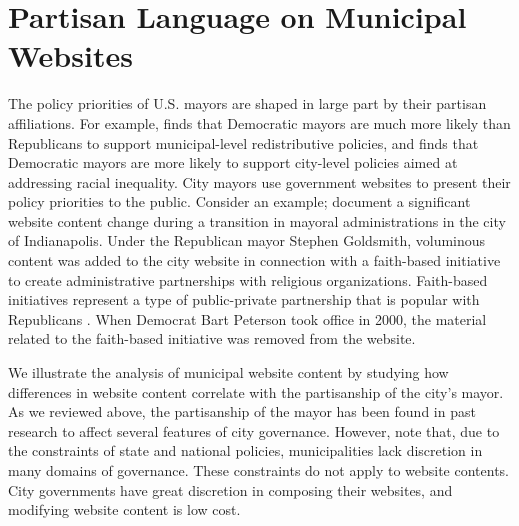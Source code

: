 \documentclass[11pt]{article}
\begin{document}
\section{Partisan Language on Municipal Websites}

The policy priorities of U.S. mayors are shaped in large part by their partisan affiliations. For example, \citet{einstein2018mayors} finds that Democratic mayors are much more likely than Republicans to support municipal-level redistributive policies, and \citet{einstein2021pictures} finds that Democratic mayors are more likely to support city-level policies aimed at addressing racial inequality. City mayors use government websites to present their policy priorities to the public. Consider an example; \citet[p.55]{formicola2003faith} document a significant website content change during a transition in mayoral administrations in the city of Indianapolis. Under the Republican mayor Stephen Goldsmith, voluminous content was added to the city website in connection with a faith-based initiative to create administrative partnerships with religious organizations. Faith-based initiatives represent a type of public-private partnership that is popular with Republicans \citep{saperstein2003public}. When Democrat Bart Peterson took office in 2000, the material related to the faith-based initiative was removed from the website. 

We illustrate the analysis of municipal website content by studying how differences in website content correlate with the partisanship of the city's mayor. As we reviewed above, the partisanship of the mayor has been found in past research to affect several features of city governance. However, \citet{gerber2011mayors} note that, due to the constraints of state and national policies, municipalities lack discretion in many domains of governance. These constraints do not apply to website contents. City governments have great discretion in composing their websites, and modifying website content is low cost. 

\end{document}
